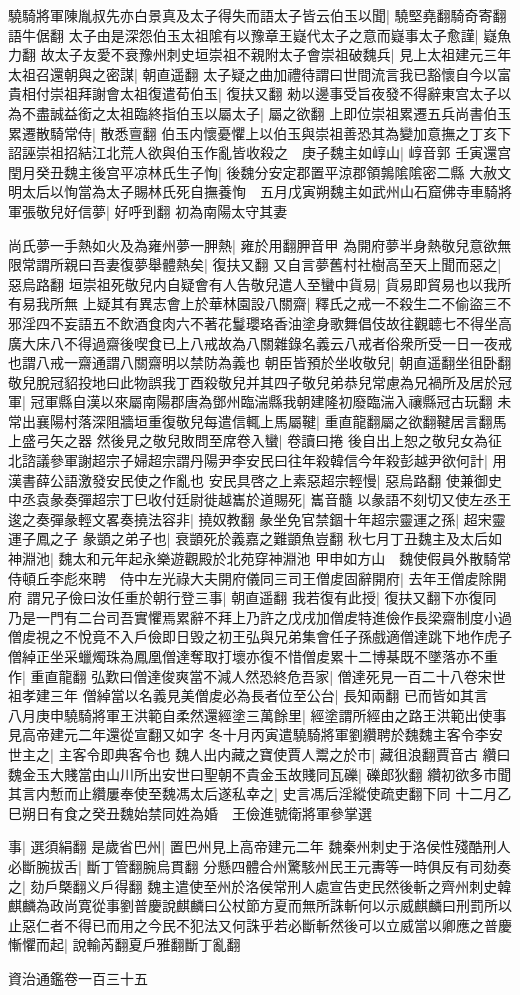 驍騎將軍陳胤叔先亦白景真及太子得失而語太子皆云伯玉以聞|{
	驍堅堯翻騎奇寄翻語牛倨翻}
太子由是深怨伯玉太祖隂有以豫章王嶷代太子之意而嶷事太子愈謹|{
	嶷魚力翻}
故太子友愛不衰豫州刺史垣崇祖不親附太子會崇祖破魏兵|{
	見上太祖建元三年}
太祖召還朝與之密謀|{
	朝直遥翻}
太子疑之曲加禮待謂曰世間流言我已豁懷自今以富貴相付崇祖拜謝會太祖復遣荀伯玉|{
	復扶又翻}
勑以邊事受旨夜發不得辭東宫太子以為不盡誠益銜之太祖臨終指伯玉以屬太子|{
	屬之欲翻}
上即位崇祖累遷五兵尚書伯玉累遷散騎常侍|{
	散悉亶翻}
伯玉内懷憂懼上以伯玉與崇祖善恐其為變加意撫之丁亥下詔誣崇祖招結江北荒人欲與伯玉作亂皆收殺之　庚子魏主如崞山|{
	崞音郭}
壬寅還宫　閏月癸丑魏主後宫平凉林氏生子恂|{
	後魏分安定郡置平涼郡領鶉隂隂密二縣}
大赦文明太后以恂當為太子賜林氏死自撫養恂　五月戊寅朔魏主如武州山石窟佛寺車騎將軍張敬兒好信夢|{
	好呼到翻}
初為南陽太守其妻

尚氏夢一手熱如火及為雍州夢一胛熱|{
	雍於用翻胛音甲}
為開府夢半身熱敬兒意欲無限常謂所親曰吾妻復夢舉體熱矣|{
	復扶又翻}
又自言夢舊村社樹高至天上聞而惡之|{
	惡烏路翻}
垣崇祖死敬兒内自疑會有人告敬兒遣人至蠻中貨易|{
	貨易即貿易也以我所有易我所無}
上疑其有異志會上於華林園設八關齋|{
	釋氏之戒一不殺生二不偷盜三不邪淫四不妄語五不飲酒食肉六不著花鬘瓔珞香油塗身歌舞倡伎故往觀聼七不得坐高廣大床八不得過齋後喫食已上八戒故為八關雜錄名義云八戒者俗衆所受一日一夜戒也謂八戒一齋通謂八關齋明以禁防為義也}
朝臣皆預於坐收敬兒|{
	朝直遥翻坐徂卧翻}
敬兒脫冠貂投地曰此物誤我丁酉殺敬兒并其四子敬兒弟恭兒常慮為兄禍所及居於冠軍|{
	冠軍縣自漢以來屬南陽郡唐為鄧州臨湍縣我朝建隆初廢臨湍入禳縣冠古玩翻}
未常出襄陽村落深阻牆垣重復敬兒每遣信輒上馬屬鞬|{
	重直龍翻屬之欲翻鞬居言翻馬上盛弓矢之器}
然後見之敬兒敗問至席卷入蠻|{
	卷讀曰捲}
後自出上恕之敬兒女為征北諮議參軍謝超宗子婦超宗謂丹陽尹李安民曰往年殺韓信今年殺彭越尹欲何計|{
	用漢書薛公語激發安民使之作亂也}
安民具啓之上素惡超宗輕慢|{
	惡烏路翻}
使兼御史中丞袁彖奏彈超宗丁巳收付廷尉徙越巂於道賜死|{
	巂音髓}
以彖語不刻切又使左丞王逡之奏彈彖輕文畧奏撓法容非|{
	撓奴教翻}
彖坐免官禁錮十年超宗靈運之孫|{
	超宋靈運子鳳之子}
彖顗之弟子也|{
	衰顗死於義嘉之難顗魚豈翻}
秋七月丁丑魏主及太后如神淵池|{
	魏太和元年起永樂遊觀殿於北苑穿神淵池}
甲申如方山　魏使假員外散騎常侍頓丘李彪來聘　侍中左光祿大夫開府儀同三司王僧䖍固辭開府|{
	去年王僧䖍除開府}
謂兄子儉曰汝任重於朝行登三事|{
	朝直遥翻}
我若復有此授|{
	復扶又翻下亦復同}
乃是一門有二台司吾實懼焉累辭不拜上乃許之戊戌加僧䖍特進儉作長梁齋制度小過僧䖍視之不悅竟不入戶儉即日毁之初王弘與兄弟集會任子孫戲適僧達跳下地作虎子僧綽正坐采蠟燭珠為鳳凰僧達奪取打壞亦復不惜僧䖍累十二博棊既不墜落亦不重作|{
	重直龍翻}
弘歎曰僧達俊爽當不減人然恐終危吾家|{
	僧達死見一百二十八卷宋世祖孝建三年}
僧綽當以名義見美僧䖍必為長者位至公台|{
	長知兩翻}
已而皆如其言　八月庚申驍騎將軍王洪範自柔然還經塗三萬餘里|{
	經塗謂所經由之路王洪範出使事見高帝建元二年還從宣翻又如字}
冬十月丙寅遣驍騎將軍劉纘聘於魏魏主客令李安世主之|{
	主客令即典客令也}
魏人出内藏之寶使賈人鬻之於市|{
	藏徂浪翻賈音古}
纘曰魏金玉大賤當由山川所出安世曰聖朝不貴金玉故賤同瓦礫|{
	礫郎狄翻}
纘初欲多市聞其言内慙而止纘屢奉使至魏馮太后遂私幸之|{
	史言馮后淫縱使疏吏翻下同}
十二月乙巳朔日有食之癸丑魏始禁同姓為婚　王儉進號衛將軍參掌選

事|{
	選須絹翻}
是歲省巴州|{
	置巴州見上高帝建元二年}
魏秦州刺史于洛侯性殘酷刑人必斷腕拔舌|{
	斷丁管翻腕烏貫翻}
分懸四體合州驚駭州民王元夀等一時俱反有司劾奏之|{
	劾戶槩翻义戶得翻}
魏主遣使至州於洛侯常刑人處宣告吏民然後斬之齊州刺史韓麒麟為政尚寛從事劉普慶說麒麟曰公杖節方夏而無所誅斬何以示威麒麟曰刑罰所以止惡仁者不得已而用之今民不犯法又何誅乎若必斷斬然後可以立威當以卿應之普慶慚懼而起|{
	說輸芮翻夏戶雅翻斷丁亂翻}


資治通鑑卷一百三十五
